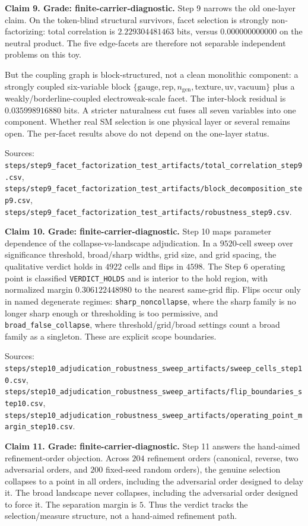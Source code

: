 \documentclass[11pt]{article}
\begin{document}
\textbf{Claim 9. Grade: finite-carrier-diagnostic.}
Step 9 narrows the old one-layer claim. On the token-blind structural survivors, facet selection is strongly non-factorizing: total correlation is \(2.229304481463\) bits, versus \(0.000000000000\) on the neutral product. The five edge-facets are therefore not separable independent problems on this toy.

But the coupling graph is block-structured, not a clean monolithic component: a strongly coupled six-variable block \(\{\text{gauge},\text{rep},n_{\mathrm{gen}},\text{texture},\text{uv},\text{vacuum}\}\) plus a weakly/borderline-coupled electroweak-scale facet. The inter-block residual is \(0.035998916880\) bits. A stricter naturalness cut fuses all seven variables into one component. Whether real SM selection is one physical layer or several remains open. The per-facet results above do not depend on the one-layer status.

Sources: \texttt{steps/step9\_facet\_factorization\_test\_artifacts/total\_correlation\_step9.csv}, \texttt{steps/step9\_facet\_factorization\_test\_artifacts/block\_decomposition\_step9.csv}, \texttt{steps/step9\_facet\_factorization\_test\_artifacts/robustness\_step9.csv}.

\textbf{Claim 10. Grade: finite-carrier-diagnostic.}
Step 10 maps parameter dependence of the collapse-vs-landscape adjudication. In a \(9520\)-cell sweep over significance threshold, broad/sharp widths, grid size, and grid spacing, the qualitative verdict holds in \(4922\) cells and flips in \(4598\). The Step 6 operating point is classified \texttt{VERDICT\_HOLDS} and is interior to the hold region, with normalized margin \(0.306122448980\) to the nearest same-grid flip. Flips occur only in named degenerate regimes: \texttt{sharp\_noncollapse}, where the sharp family is no longer sharp enough or thresholding is too permissive, and \texttt{broad\_false\_collapse}, where threshold/grid/broad settings count a broad family as a singleton. These are explicit scope boundaries.

Sources: \texttt{steps/step10\_adjudication\_robustness\_sweep\_artifacts/sweep\_cells\_step10.csv}, \texttt{steps/step10\_adjudication\_robustness\_sweep\_artifacts/flip\_boundaries\_step10.csv}, \texttt{steps/step10\_adjudication\_robustness\_sweep\_artifacts/operating\_point\_margin\_step10.csv}.

\textbf{Claim 11. Grade: finite-carrier-diagnostic.}
Step 11 answers the hand-aimed refinement-order objection. Across \(204\) refinement orders (canonical, reverse, two adversarial orders, and \(200\) fixed-seed random orders), the genuine selection collapses to a point in all orders, including the adversarial order designed to delay it. The broad landscape never collapses, including the adversarial order designed to force it. The separation margin is \(5\). Thus the verdict tracks the selection/measure structure, not a hand-aimed refinement path.
\end{document}
